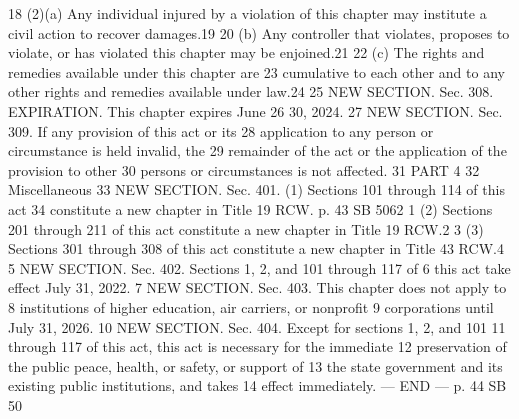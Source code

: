 18 (2)(a) Any individual injured by a violation of this chapter may
institute a civil action to recover damages.19
20 (b) Any controller that violates, proposes to violate, or has
violated this chapter may be enjoined.21
22 (c) The rights and remedies available under this chapter are
23 cumulative to each other and to any other rights and remedies
available under law.24
25 NEW SECTION. Sec. 308. EXPIRATION. This chapter expires June
26 30, 2024.
27 NEW SECTION. Sec. 309. If any provision of this act or its
28 application to any person or circumstance is held invalid, the
29 remainder of the act or the application of the provision to other
30 persons or circumstances is not affected.
31 PART 4
32 Miscellaneous
33 NEW SECTION. Sec. 401. (1) Sections 101 through 114 of this act
34 constitute a new chapter in Title 19 RCW.
p. 43 SB 5062
1 (2) Sections 201 through 211 of this act constitute a new chapter
in Title 19 RCW.2
3 (3) Sections 301 through 308 of this act constitute a new chapter
in Title 43 RCW.4
5 NEW SECTION. Sec. 402. Sections 1, 2, and 101 through 117 of
6 this act take effect July 31, 2022.
7 NEW SECTION. Sec. 403. This chapter does not apply to
8 institutions of higher education, air carriers, or nonprofit
9 corporations until July 31, 2026.
10 NEW SECTION. Sec. 404. Except for sections 1, 2, and 101
11 through 117 of this act, this act is necessary for the immediate
12 preservation of the public peace, health, or safety, or support of
13 the state government and its existing public institutions, and takes
14 effect immediately.
--- END ---
p. 44 SB 50